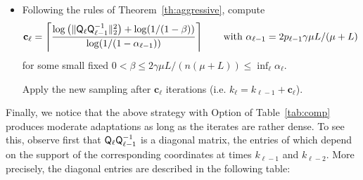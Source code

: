 {\begin{itemize}
{\begin{align*}
\begin{array}{cccc}
        \end{array} \right)~~~~~
    \end{align*}} associated $\bP_\ell  $, $\bQ_\ell$, and $\bQ_\ell^{-1}$. Notice that $ \lambda_{\min}(\bP_{\ell}) = p_{\ell} = s/|\mathrm{null}(x^k)|$.
    \item  Following the rules of Theorem~\ref{th:aggressive}, compute
    \begin{align*}
        \mathbf{c}_\ell = \left\lceil \frac{\log\left(\|  {\mathsf{Q}}_\ell   {\mathsf{Q}}_{\ell-1}^{-1} \|_2^2 \right) + \log(1/(1-\beta)) }{\log( 1/(1-\alpha_{\ell-1}))}\right\rceil \qquad
        \text{with~}\alpha_{\ell-1} =2 p_{\ell-1} \gamma\mu L /(\mu+L)
    \end{align*}  
    for some small fixed $0<\beta \leq 2 \gamma\mu L /(n(\mu+L)) \leq\inf_{\ell} \alpha_\ell $. 
    
    
    Apply the new sampling %
    after $\mathbf{c}_\ell$ iterations (i.e. $k_{\ell} = k_{\ell-1}+\mathbf{c}_\ell$).
\end{itemize}

\smallskip
Finally, we notice that the above strategy with Option of Table~\ref{tab:comp} produces moderate adaptations as long as the iterates are rather dense. To see this, observe first that ${\mathsf{Q}}_\ell   {\mathsf{Q}}_{\ell-1}^{-1}$ is a diagonal matrix, the entries of which depend on the support of the corresponding coordinates at times ${k_{\ell -1}}$ and ${k_{\ell -2}}$. More precisely, the diagonal entries are described in the following table:

}
